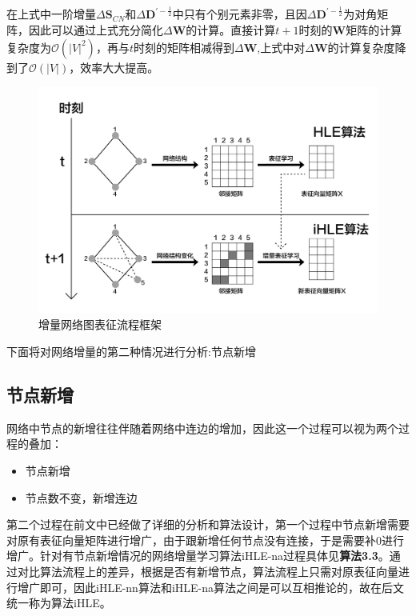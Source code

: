 在上式中一阶增量$\Delta\textbf{S}_{CN}$和$\Delta\textbf{D}^{\prime-\frac{1}{2}}$中只有个别元素非零，且因$\Delta\textbf{D}^{\prime-\frac{1}{2}}$为对角矩阵，因此可以通过上式充分简化$\Delta\textbf{W}$的计算。直接计算$t+1$时刻的\textbf{W}矩阵的计算复杂度为$\mathcal{O}(|V|^2)$，再与$t$时刻的矩阵相减得到$\Delta\textbf{W}$,上式中对$\Delta\textbf{W}$的计算复杂度降到了$\mathcal{O}(|V|)$，效率大大提高。
\begin{figure}[htbp]
	\centering
	\includegraphics[width=6in]{figures/incremental_network_embedding}
	\caption{增量网络图表征流程框架}
	\label{fig:incremental_network_embedding}
\end{figure}

下面将对网络增量的第二种情况进行分析:节点新增
\subsection{节点新增}
网络中节点的新增往往伴随着网络中连边的增加，因此这一个过程可以视为两个过程的叠加：
\begin{itemize}
	\item 节点新增
	\item 节点数不变，新增连边
\end{itemize}
第二个过程在前文中已经做了详细的分析和算法设计，第一个过程中节点新增需要对原有表征向量矩阵进行增广，由于跟新增任何节点没有连接，于是需要补0进行增广。针对有节点新增情况的网络增量学习算法iHLE-na过程具体见\textbf{算法3.3}。通过对比算法流程上的差异，根据是否有新增节点，算法流程上只需对原表征向量进行增广即可，因此iHLE-nn算法和iHLE-na算法之间是可以互相推论的，故在后文统一称为算法iHLE。

